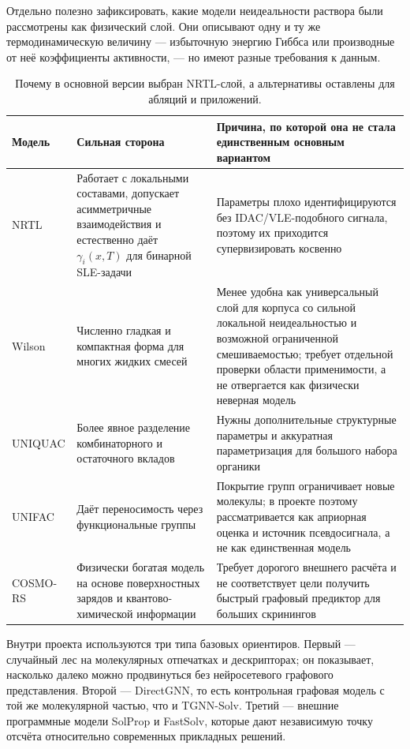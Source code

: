 \documentclass[11pt]{article}
\theoremstyle{definition}
\begin{document}
Отдельно полезно зафиксировать, какие модели неидеальности раствора были рассмотрены как физический слой. Они описывают одну и ту же термодинамическую величину --- избыточную энергию Гиббса или производные от неё коэффициенты активности, --- но имеют разные требования к данным.

\begin{table}[H]
\centering
\caption{Почему в основной версии выбран NRTL-слой, а альтернативы оставлены для абляций и приложений.}
\label{tab:activity-models}
\small
\begin{tabularx}{\textwidth}{P{0.16\textwidth}Y Y}
\toprule
Модель & Сильная сторона & Причина, по которой она не стала единственным основным вариантом \\
\midrule
NRTL & Работает с локальными составами, допускает асимметричные взаимодействия и естественно даёт $\gamma_i(x,T)$ для бинарной SLE-задачи~\cite{renon1968} & Параметры плохо идентифицируются без IDAC/VLE-подобного сигнала, поэтому их приходится супервизировать косвенно \\
Wilson & Численно гладкая и компактная форма для многих жидких смесей~\cite{wilson1964} & Менее удобна как универсальный слой для корпуса со сильной локальной неидеальностью и возможной ограниченной смешиваемостью; требует отдельной проверки области применимости, а не отвергается как физически неверная модель \\
UNIQUAC & Более явное разделение комбинаторного и остаточного вкладов~\cite{abrams1975} & Нужны дополнительные структурные параметры и аккуратная параметризация для большого набора органики \\
UNIFAC & Даёт переносимость через функциональные группы~\cite{fredenslund1975,weidlich1987} & Покрытие групп ограничивает новые молекулы; в проекте поэтому рассматривается как априорная оценка и источник псевдосигнала, а не как единственная модель \\
COSMO-RS & Физически богатая модель на основе поверхностных зарядов и квантово-химической информации~\cite{klamt1995} & Требует дорогого внешнего расчёта и не соответствует цели получить быстрый графовый предиктор для больших скринингов \\
\bottomrule
\end{tabularx}
\end{table}

Внутри проекта используются три типа базовых ориентиров. Первый --- случайный лес на молекулярных отпечатках и дескрипторах; он показывает, насколько далеко можно продвинуться без нейросетевого графового представления. Второй --- DirectGNN, то есть контрольная графовая модель с той же молекулярной частью, что и TGNN-Solv. Третий --- внешние программные модели SolProp и FastSolv, которые дают независимую точку отсчёта относительно современных прикладных решений.
\end{document}
